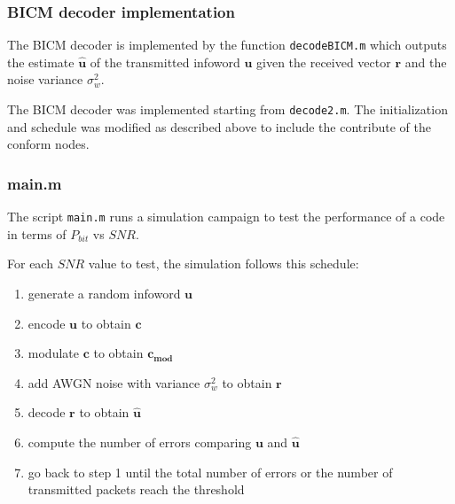 \documentclass[]{beamer}
\begin{document}
\begin{frame}
\transwipe[direction=0]
\frametitle{BICM decoder implementation}
The BICM decoder is implemented by the function \texttt{decodeBICM.m} which outputs the estimate $\mathbf{\widehat u}$ of the transmitted infoword $\mathbf{u}$ given the received vector $\mathbf{r}$ and the noise variance $\sigma_w^2$. 

\vspace{0.5cm}

The BICM decoder was implemented starting from \texttt{decode2.m}. The initialization and schedule was modified as described above to include the contribute of the conform nodes.
\end{frame}

\begin{frame}
\transwipe[direction=0]
\frametitle{main.m}
The script \texttt{main.m} runs a simulation campaign to test the performance of a code in terms of $P_{bit}$ vs $SNR$.

For each $SNR$ value to test, the simulation follows this schedule:
	\begin{enumerate}
		\item generate a random infoword $\mathbf{u}$
		\item encode $\mathbf{u}$ to obtain $\mathbf{c}$
		\item modulate $\mathbf{c}$ to obtain $\mathbf{c_{mod}}$
		\item add AWGN noise with variance $\sigma_w^2$ to obtain $\mathbf{r}$
		\item decode $\mathbf{r}$ to obtain $\mathbf{\widehat u}$
		\item compute the number of errors comparing $\mathbf{u}$ and $\mathbf{\widehat u}$
		\item go back to step 1 until the total number of errors or the number of transmitted packets reach the threshold
	\end{enumerate}

\end{frame}

\end{document}
